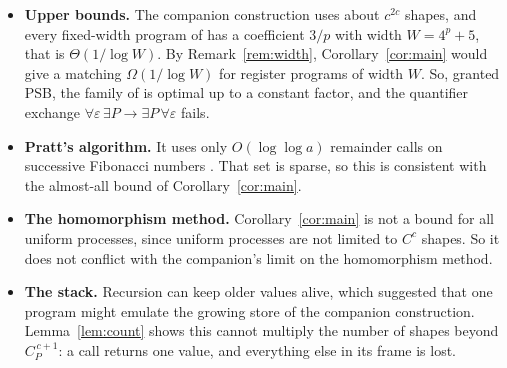 \documentclass[11pt]{article}
\theoremstyle{remark}
\begin{document}
\begin{itemize}
\item \textbf{Upper bounds.} The companion construction uses about $c^{2c}$
shapes, and every fixed-width program of \cite{fixedwidth} has a coefficient
$3/p$ with width $W=4^p+5$, that is $\Theta(1/\log W)$. By
Remark~\ref{rem:width},
Corollary~\ref{cor:main} would give a matching $\Omega(1/\log W)$ for register
programs of width $W$. So, granted PSB, the family of \cite{fixedwidth} is
optimal up to a constant factor, and the quantifier exchange
$\forall\varepsilon\,\exists P\to\exists P\,\forall\varepsilon$ fails.
\item \textbf{Pratt's algorithm.} It uses only $O(\log\log a)$ remainder
calls on successive Fibonacci numbers \cite[Corollary~6C.7]{book}. That set
is sparse, so this is consistent with the almost-all bound of
Corollary~\ref{cor:main}.
\item \textbf{The homomorphism method.} Corollary~\ref{cor:main} is not a
bound for all uniform processes, since uniform processes are not limited to
$C^c$ shapes. So it does not conflict with the companion's limit on the
homomorphism method.
\item \textbf{The stack.} Recursion can keep older values alive, which
suggested that one program might emulate the growing store of the companion
construction. Lemma~\ref{lem:count} shows this cannot multiply the number of
shapes beyond $C_P^{\,c+1}$: a call returns one value, and everything else in
its frame is lost.
\end{itemize}
\end{document}
